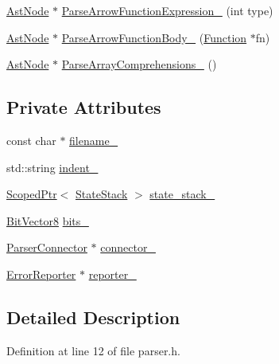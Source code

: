 \begin{DoxyCompactItemize}
\item 
\hyperlink{classmocha_1_1_ast_node}{AstNode} $\ast$ \hyperlink{classmocha_1_1_parser_a7fd1cd22c561bfed8dc0feeb1c8fb07a}{ParseArrowFunctionExpression\_\-} (int type)
\item 
\hyperlink{classmocha_1_1_ast_node}{AstNode} $\ast$ \hyperlink{classmocha_1_1_parser_a4ecb375916d77add07df58b477beaf41}{ParseArrowFunctionBody\_\-} (\hyperlink{classmocha_1_1_function}{Function} $\ast$fn)
\item 
\hyperlink{classmocha_1_1_ast_node}{AstNode} $\ast$ \hyperlink{classmocha_1_1_parser_a31f3c91e072b8b5b9fc47ead5d12a2ff}{ParseArrayComprehensions\_\-} ()
\end{DoxyCompactItemize}
\subsection*{Private Attributes}
\begin{DoxyCompactItemize}
\item 
const char $\ast$ \hyperlink{classmocha_1_1_parser_a6ce640ba66a27ff0309fcacd70e8ccf0}{filename\_\-}
\item 
std::string \hyperlink{classmocha_1_1_parser_a539ea72fa95db59adfe32c7cbd73506d}{indent\_\-}
\item 
\hyperlink{classmocha_1_1_scoped_ptr}{ScopedPtr}$<$ \hyperlink{classmocha_1_1_parser_1_1_state_stack}{StateStack} $>$ \hyperlink{classmocha_1_1_parser_a7c8173ec170938b02d0c812c47d15134}{state\_\-stack\_\-}
\item 
\hyperlink{classmocha_1_1_bit_vector}{BitVector8} \hyperlink{classmocha_1_1_parser_a68b155333cc401e16543f4b6267c6998}{bits\_\-}
\item 
\hyperlink{classmocha_1_1_parser_connector}{ParserConnector} $\ast$ \hyperlink{classmocha_1_1_parser_ad90310da001b04cef5b5a82faf54011f}{connector\_\-}
\item 
\hyperlink{classmocha_1_1_error_reporter}{ErrorReporter} $\ast$ \hyperlink{classmocha_1_1_parser_aebb487c9fe126bab58b5c76e1995127d}{reporter\_\-}
\end{DoxyCompactItemize}


\subsection{Detailed Description}


Definition at line 12 of file parser.h.



